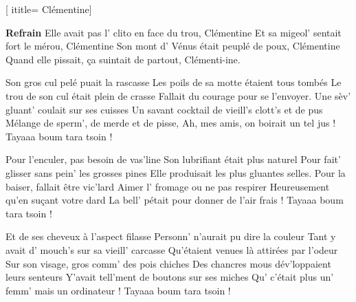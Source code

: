  [
ititle= {Clémentine}]


\beginchorus
\textbf {Refrain}
Elle avait pas l' clito en face du trou, Clémentine
Et sa migeol' sentait fort le mérou, Clémentine
Son mont d' Vénus était peuplé de poux, Clémentine
Quand elle pissait, ça suintait de partout, Clémenti-ine.
\endchorus

\beginverse
Son gros cul pelé puait la rascasse
Les poils de sa motte étaient tous tombés
Le trou de son cul était plein de crasse
Fallait du courage pour se l'envoyer.
Une sèv' gluant' coulait sur ses cuisses
Un savant cocktail de vieill's clott's et de pus
Mélange de sperm', de merde et de pisse,
Ah, mes amis, on boirait un tel jus !
Tayaaa boum tara tsoin !
\endverse

\beginverse
Pour l'enculer, pas besoin de vas'line
Son lubrifiant était plus naturel
Pour fait' glisser sans pein' les grosses pines
Elle produisait les plus gluantes selles.
Pour la baiser, fallait être vic'lard
Aimer l' fromage ou ne pas respirer
Heureusement qu'en suçant votre dard
La bell' pétait pour donner de l'air frais !
Tayaaa boum tara tsoin !
\endverse

\beginverse
Et de ses cheveux à l'aspect filasse
Personn' n'aurait pu dire la couleur
Tant y avait d' mouch's sur sa vieill' carcasse
Qu'étaient venues là attirées par l'odeur
Sur son visage, gros comm' des pois chiches
Des chancres mous dév'loppaient leurs senteurs
Y'avait tell'ment de boutons sur ses miches
Qu' c'était plus un' femm' mais un ordinateur !
Tayaaa boum tara tsoin !
\endverse

\endsong